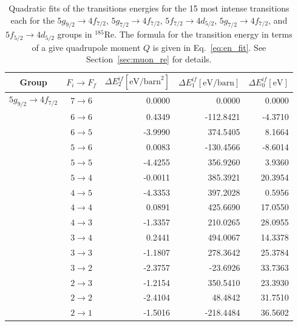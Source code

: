 \begin{table}[b]
\caption{\label{tab:re185energ}%
Quadratic fits of the transitions energies for the 15 most intense transitions each for the $5g_{9/2}\rightarrow4f_{7/2}$, $5g_{7/2}\rightarrow4f_{7/2}$, $5f_{7/2}\rightarrow4d_{5/2}$, $5g_{7/2}\rightarrow4f_{7/2}$, and $5f_{5/2}\rightarrow4d_{5/2}$ groups in $^{185}$Re. The formula for the transition energy in terms of a give quadrupole moment $Q$ is given in Eq.~\eqref{eq:en_fit}. See Section~\ref{sec:muon_re} for details.}
\centering
\begin{tiny}
\begin{tabular}{cc|rrr}
Group& $F_i \rightarrow F_f$ & $\Delta E_2^{if} [\text{eV/barn}^2]$ & $\Delta E_1^{if} [\text{eV/barn}]$ & $\Delta E_0^{if} [\text{eV}]$\\[1pt]\hline%
$5g_{9/2} \rightarrow 4f_{7/2}$ & $7 \rightarrow 6$ & 0.0000 & 0.0000 & 0.0000 \\
& $6 \rightarrow 6$ & 0.4349 & -112.8421 & -4.3710 \\
& $6 \rightarrow 5$ & -3.9990 & 374.5405 & 8.1664 \\
& $5 \rightarrow 6$ & 0.0083 & -130.4566 & -8.6014 \\
& $5 \rightarrow 5$ & -4.4255 & 356.9260 & 3.9360 \\
& $5 \rightarrow 4$ & -0.0011 & 385.3921 & 20.3954 \\
& $4 \rightarrow 5$ & -4.3353 & 397.2028 & 0.5956 \\
& $4 \rightarrow 4$ & 0.0891 & 425.6690 & 17.0550 \\
& $4 \rightarrow 3$ & -1.3357 & 210.0265 & 28.0955 \\
& $3 \rightarrow 4$ & 0.2441 & 494.0067 & 14.3378 \\
& $3 \rightarrow 3$ & -1.1807 & 278.3642 & 25.3784 \\
& $3 \rightarrow 2$ & -2.3757 & -23.6926 & 33.7363 \\
& $2 \rightarrow 3$ & -1.2154 & 350.5410 & 23.3930 \\
& $2 \rightarrow 2$ & -2.4104 & 48.4842 & 31.7510 \\
& $2 \rightarrow 1$ & -1.5016 & -218.4484 & 36.5602 \\[7pt]


\end{tabular}
\end{tiny}
\end{table}
